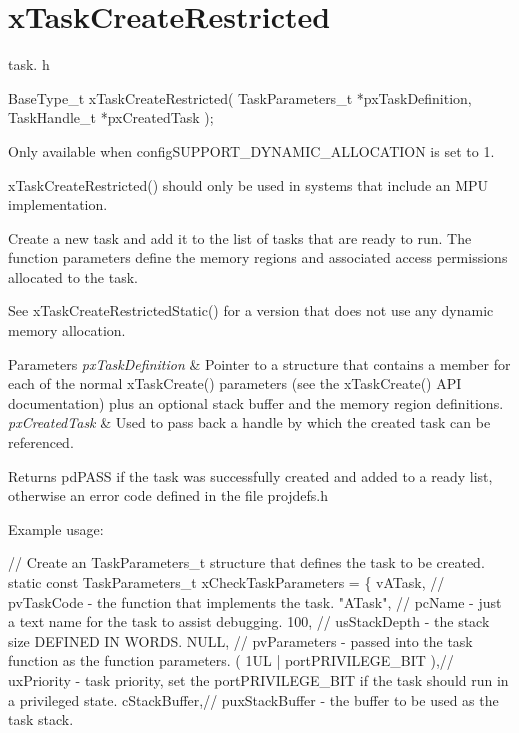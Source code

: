 \hypertarget{group__xTaskCreateRestricted}{}\section{x\+Task\+Create\+Restricted}
\label{group__xTaskCreateRestricted}
task. h 
\begin{DoxyPre}
 BaseType\_t xTaskCreateRestricted( TaskParameters\_t *pxTaskDefinition, TaskHandle\_t *pxCreatedTask );\end{DoxyPre}


Only available when config\+S\+U\+P\+P\+O\+R\+T\+\_\+\+D\+Y\+N\+A\+M\+I\+C\+\_\+\+A\+L\+L\+O\+C\+A\+T\+I\+ON is set to 1.

x\+Task\+Create\+Restricted() should only be used in systems that include an M\+PU implementation.

Create a new task and add it to the list of tasks that are ready to run. The function parameters define the memory regions and associated access permissions allocated to the task.

See x\+Task\+Create\+Restricted\+Static() for a version that does not use any dynamic memory allocation.


\begin{DoxyParams}{Parameters}
{\em px\+Task\+Definition} & Pointer to a structure that contains a member for each of the normal x\+Task\+Create() parameters (see the x\+Task\+Create() A\+PI documentation) plus an optional stack buffer and the memory region definitions.\\
\hline
{\em px\+Created\+Task} & Used to pass back a handle by which the created task can be referenced.\\
\hline
\end{DoxyParams}
\begin{DoxyReturn}{Returns}
pd\+P\+A\+SS if the task was successfully created and added to a ready list, otherwise an error code defined in the file projdefs.\+h
\end{DoxyReturn}
Example usage\+: 
\begin{DoxyPre}
// Create an TaskParameters\_t structure that defines the task to be created.
static const TaskParameters\_t xCheckTaskParameters =
\{
    vATask,     // pvTaskCode - the function that implements the task.
    "ATask",    // pcName - just a text name for the task to assist debugging.
    100,        // usStackDepth - the stack size DEFINED IN WORDS.
    NULL,       // pvParameters - passed into the task function as the function parameters.
    ( 1UL | portPRIVILEGE\_BIT ),// uxPriority - task priority, set the portPRIVILEGE\_BIT if the task should run in a privileged state.
    cStackBuffer,// puxStackBuffer - the buffer to be used as the task stack.\end{DoxyPre}



